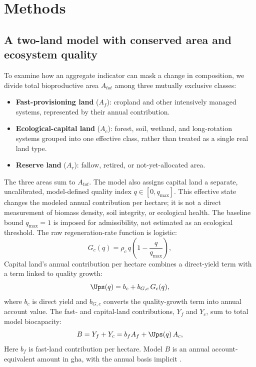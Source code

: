 \section{Methods}\label{sec:model}

\subsection{A two-land model with conserved area and ecosystem quality}\label{sec:equations}

To examine how an aggregate indicator can mask a change in composition, we divide total bioproductive area $A_{tot}$ among three mutually exclusive classes:
\begin{itemize}
  \item \textbf{Fast-provisioning land} ($A_f$): cropland and other intensively managed systems, represented by their annual contribution.
  \item \textbf{Ecological-capital land} ($A_c$): forest, soil, wetland, and long-rotation systems grouped into one effective class, rather than treated as a single real land type.
  \item \textbf{Reserve land} ($A_r$): fallow, retired, or not-yet-allocated area.
\end{itemize}
The three areas sum to $A_{tot}$. The model also assigns capital land a separate, uncalibrated, model-defined quality index $q\in[0,q_{\max}]$. This effective state changes the modeled annual contribution per hectare; it is not a direct measurement of biomass density, soil integrity, or ecological health. The baseline bound $q_{\max}=1$ is imposed for admissibility, not estimated as an ecological threshold. The raw regeneration-rate function is logistic:
\begin{equation}\label{eq:Gc}
G_c(q)=\rho_c\,q\left(1-\frac{q}{q_{\max}}\right),
\end{equation}
Capital land's annual contribution per hectare combines a direct-yield term with a term linked to quality growth:
\begin{equation}\label{eq:Ups}
\Ups(q)=b_c+b_{G,c}\,G_c(q),
\end{equation}
where $b_c$ is direct yield and $b_{G,c}$ converts the quality-growth term into annual account value. The fast- and capital-land contributions, $Y_f$ and $Y_c$, sum to total model biocapacity:
\begin{equation}\label{eq:B}
B=Y_f+Y_c=b_f A_f+\Ups(q)\,A_c ,
\end{equation}
Here $b_f$ is fast-land contribution per hectare. Model $B$ is an annual account-equivalent amount in gha, with the annual basis implicit \citep{GFNStandards2009,GFNGuidebook2019}.

